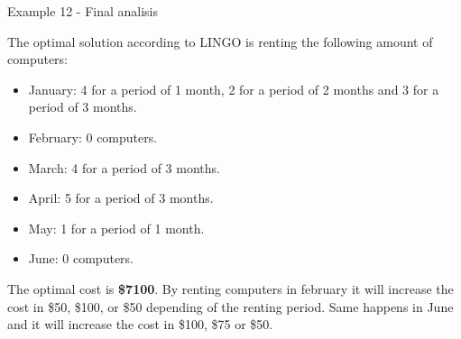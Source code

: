 \begin{frame}{Example 12 - Final analisis}

\footnotesize{
The optimal solution according to LINGO is renting the following amount of
computers:

\begin{itemize}
\item January: 4 for a period of 1 month, 2 for a period of 2 months and 3
      for a period of 3 months. \\
\item February: 0 computers. \\
\item March: 4 for a period of 3 months. \\
\item April: 5 for a period of 3 months. \\
\item May: 1 for a period of  1 month. \\
\item June: 0 computers. \\
\end{itemize}

The optimal cost is \textbf{\$7100}. By renting computers in february it will
increase the cost in \$50, \$100, or \$50 depending of the renting period.
Same happens in June and it will increase the cost in \$100, \$75 or \$50.
}

\end{frame}
